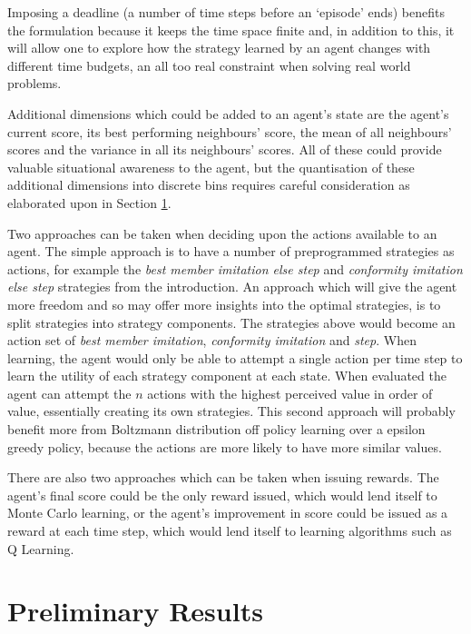 \documentclass[conference]{IEEEtran}
\begin{document}
Imposing a deadline (a number of time steps before an `episode' ends)
benefits the formulation
because it keeps the time space finite
and, in addition to this, it will allow one to explore
how the strategy learned by an agent changes with different time budgets,
an all too real constraint when solving real world problems.


Additional dimensions which could be added to an agent's state
are the agent's current score, its best performing neighbours' score,
the mean of all neighbours' scores
and the variance in all its neighbours' scores.
All of these could provide valuable situational awareness to the agent,
but the quantisation of these additional dimensions into discrete bins
requires careful consideration as elaborated upon in Section \ref{results}.

Two approaches can be taken when deciding upon
the actions available to an agent.
The simple approach is to have a number of preprogrammed strategies as actions,
for example the \emph{best member imitation else step}
and \emph{conformity imitation else step} strategies from the introduction.
An approach which will give the agent more freedom
and so may offer more insights into the optimal strategies,
is to split strategies into strategy components.
The strategies above would become an action set of
\emph{best member imitation}, \emph{conformity imitation} and \emph{step}.
When learning,
the agent would only be able to attempt a single action per time step
to learn the utility of each strategy component at each state.
When evaluated the agent can attempt the $n$ actions
with the highest perceived value in order of value,
essentially creating its own strategies.
This second approach will probably benefit more from Boltzmann distribution
off policy learning over a epsilon greedy policy,
because the actions are more likely to have more similar values.

There are also two approaches which can be taken when issuing rewards.
The agent's final score could be the only reward issued,
which would lend itself to Monte Carlo learning,
or the agent's improvement in score could be issued as a reward
at each time step,
which would lend itself to learning algorithms such as Q Learning.


\section{Preliminary Results}\label{results}
\end{document}
